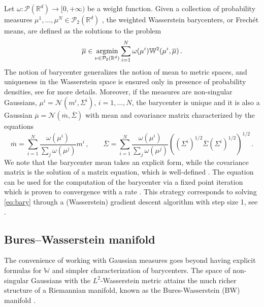 \documentclass{article}
\theoremstyle{plain}
\theoremstyle{definition}
\theoremstyle{remark}
\newcommand{\Rd}{ {\mathbb{R}^d}}
\newcommand{\W}{\mathbb{W}}
\begin{document}
Let $\omega:\mathcal{P}(\Rd)\to [0, +\infty)$ be a weight function. Given a collection of probability measures $\mu^1, \dots, \mu^N\in \mathcal{P}_2(\Rd)$ , the weighted Wasserstein barycenters, or Frech\'{e}t means, are defined as the solutions to the problem
\begin{equation}\label{eq:bary}
\overline{\mu} \in \underset{\nu\in \mathcal{P}_2(\Rd)}{\textup{argmin}} \sum_{i = 1}^N \omega(\mu^i)\W^2(\mu^i, \overline{\mu})\,.
\end{equation}
The notion of barycenter generalizes the notion of mean to metric spaces, and uniqueness in the Wasserstein space is ensured only in presence of probability densities, see \cite{cariler2011bary} for more details.  Moreover, if the measures are non-singular Gaussians, $\mu^i = \mathcal{N}(m^i,\Sigma^i)$, $i = 1,\dots,N$, the  barycenter is unique and it is also a Gaussian $\overline{\mu} = \mathcal{N}(\overline{m},\overline{\Sigma})$ with mean and covariance matrix characterized by the equations
\begin{equation}  \label{eq:BWbary}
\overline{m} = \sum_{i = 1}^N \frac{\omega(\mu^i)}{\sum_j \omega(\mu^j)} m^i \,, \qquad \overline{\Sigma} = \sum_{i=1}^N \frac{\omega(\mu^i)}{\sum_j \omega(\mu^j)} \left((\Sigma^i)^{1/2}\overline{\Sigma} (\Sigma^i)^{1/2} \right)^{1/2}\,.
\end{equation}
We note that the barycenter mean takes an explicit form, while the covariance matrix is the solution of a matrix equation, which is well-defined \cite{ruschendorf2002}. 
The  equation can be used for the computation of the barycenter via a fixed point iteration \cite{alvarez2016fixed} which is proven to convergence with a rate \cite{chewi2020gradient}. This strategy corresponds to solving \eqref{eq:bary} through a (Wasserstein) gradient descent algorithm with step size 1, see \cite{zemel2019frechet}.

\subsection{Bures--Wasserstein manifold}

The convenience of working with Gaussian measures goes beyond having explicit formulas for $\W$ and simpler characterization of  barycenters. The space of non-singular Gaussians with the $L^2$-Wasserstein metric attains the much richer structure of a Riemannian manifold,  known as the Bures-Wasserstein (BW) manifold \cite{takatsu2011,Malago2018,bathia2019}. 
\end{document}
